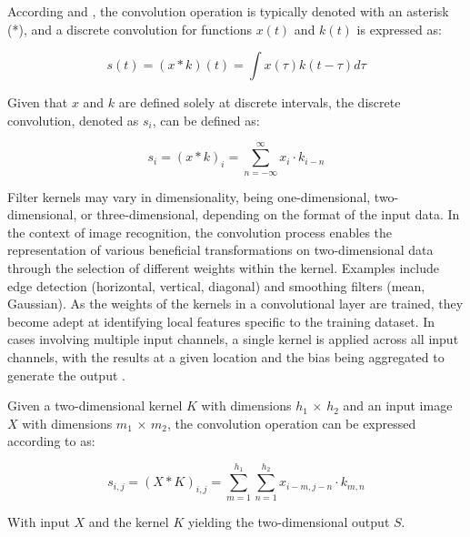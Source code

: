 According \textcite{Goodfellow2016} and \textcite{Rothmund2018}, the convolution operation is typically denoted with an asterisk (*), and a discrete convolution for functions $x(t)$ and $k(t)$ is expressed as:

\begin{equation}
    \label{eq:cnn_discrete_convolution}
    s(t) = (x * k)(t) = \int x(\tau)k(t-\tau)d\tau
\end{equation}

Given that $x$ and $k$ are defined solely at discrete intervals, the discrete convolution, denoted as $s_i$, can be defined as:

\begin{equation}
    \label{eq:cnn_discrete_convolution_si}
    s_i = (x * k)_i = \sum_{n=-\infty}^{\infty} x_i \cdot k_{i-n} 
\end{equation}

Filter kernels may vary in dimensionality, being one-dimensional, two-dimensional, or three-dimensional, depending on the format of the input data. In the context of image recognition, the convolution process enables the representation of various beneficial transformations on two-dimensional data through the selection of different weights within the kernel. Examples include edge detection (horizontal, vertical, diagonal) and smoothing filters (mean, Gaussian). As the weights of the kernels in a convolutional layer are trained, they become adept at identifying local features specific to the training dataset. In cases involving multiple input channels, a single kernel is applied across all input channels, with the results at a given location and the bias being aggregated to generate the output \cite{Bishop2023}. 

Given a two-dimensional kernel $K$ with dimensions $h_1$ × $h_2$ and an input image $X$ with dimensions $m_1$ × $m_2$, the convolution operation can be expressed according to \textcite{Rothmund2018} as:

\begin{equation}
    \label{eq:cnn_convolution_2D_1}
    s_{i, j}=(X * K)_{i, j}=\sum_{m=1}^{h_1} \sum_{n=1}^{h_2} x_{i-m, j-n} \cdot k_{m, n}
\end{equation}

With input $X$ and the kernel $K$ yielding the two-dimensional output $S$.

